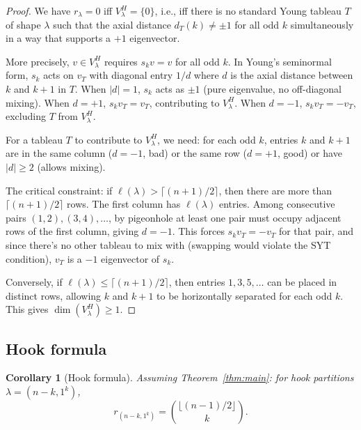\documentclass[11pt]{article}
\newtheorem{corollary}[theorem]{Corollary}
\theoremstyle{definition}
\theoremstyle{remark}
\begin{document}
\begin{proof}
We have $r_\lambda = 0$ iff $V_\lambda^H = \{0\}$, i.e., iff there is
no standard Young tableau $T$ of shape $\lambda$ such that the axial
distance $d_T(k) \ne \pm 1$ for all odd $k$ simultaneously in a way
that supports a $+1$ eigenvector.

More precisely, $v \in V_\lambda^H$ requires $s_k v = v$ for all odd $k$.
In Young's seminormal form, $s_k$ acts on $v_T$ with diagonal entry
$1/d$ where $d$ is the axial distance between $k$ and $k+1$ in $T$.
When $|d| = 1$, $s_k$ acts as $\pm 1$ (pure eigenvalue, no off-diagonal
mixing). When $d = +1$, $s_k v_T = v_T$, contributing to $V_\lambda^H$.
When $d = -1$, $s_k v_T = -v_T$, excluding $T$ from $V_\lambda^H$.

For a tableau $T$ to contribute to $V_\lambda^H$, we need: for each odd
$k$, entries $k$ and $k+1$ are in the same column ($d = -1$, bad) or the
same row ($d = +1$, good) or have $|d| \ge 2$ (allows mixing).

The critical constraint: if $\ell(\lambda) > \lceil(n+1)/2\rceil$,
then there are more than $\lceil(n+1)/2\rceil$ rows. The first column
has $\ell(\lambda)$ entries. Among consecutive pairs $(1,2), (3,4),
\ldots$, by pigeonhole at least one pair must occupy adjacent rows
of the first column, giving $d = -1$. This forces $s_k v_T = -v_T$
for that pair, and since there's no other tableau to mix with (swapping
would violate the SYT condition), $v_T$ is a $-1$ eigenvector of $s_k$.

Conversely, if $\ell(\lambda) \le \lceil(n+1)/2\rceil$, then entries
$1,3,5,\ldots$ can be placed in distinct rows, allowing $k$ and $k+1$
to be horizontally separated for each odd $k$. This gives
$\dim(V_\lambda^H) \ge 1$.
\end{proof}


\subsection{Hook formula}

\begin{corollary}[Hook formula]
\label{cor:hook}
Assuming Theorem~\ref{thm:main}: for hook partitions
$\lambda = (n-k, 1^k)$,
\[
  r_{(n-k,1^k)} = \binom{\lfloor(n-1)/2\rfloor}{k}.
\]
\end{corollary}
\end{document}
